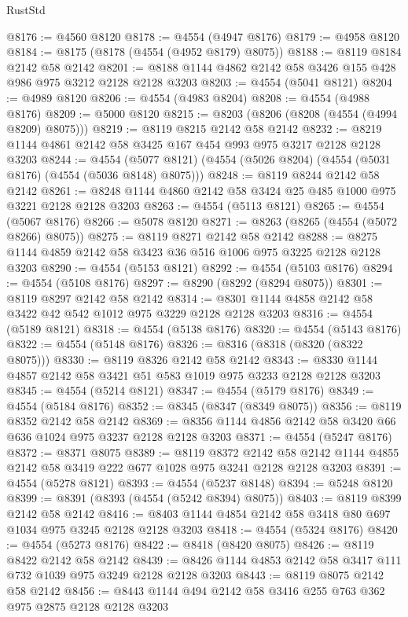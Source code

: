 \begin{lexlean}{RustStd}
\begin{coremodule}
{\begin{coremodule}
{{{{{{{{{{{{{{{{@8176 := @4560 @8120
@8178 := @4554 (@4947 @8176)
@8179 := @4958 @8120
@8184 := @8175 (@8178 (@4554 (@4952 @8179) @8075))
@8188 := @8119 @8184 @2142 @58 @2142
@8201 := @8188 @1144 @4862 @2142 @58 @3426 @155 @428 @986 @975 @3212 @2128 @2128 @3203
@8203 := @4554 (@5041 @8121)
@8204 := @4989 @8120
@8206 := @4554 (@4983 @8204)
@8208 := @4554 (@4988 @8176)
@8209 := @5000 @8120
@8215 := @8203 (@8206 (@8208 (@4554 (@4994 @8209) @8075)))
@8219 := @8119 @8215 @2142 @58 @2142
@8232 := @8219 @1144 @4861 @2142 @58 @3425 @167 @454 @993 @975 @3217 @2128 @2128 @3203
@8244 := @4554 (@5077 @8121) (@4554 (@5026 @8204) (@4554 (@5031 @8176) (@4554 (@5036 @8148) @8075)))
@8248 := @8119 @8244 @2142 @58 @2142
@8261 := @8248 @1144 @4860 @2142 @58 @3424 @25 @485 @1000 @975 @3221 @2128 @2128 @3203
@8263 := @4554 (@5113 @8121)
@8265 := @4554 (@5067 @8176)
@8266 := @5078 @8120
@8271 := @8263 (@8265 (@4554 (@5072 @8266) @8075))
@8275 := @8119 @8271 @2142 @58 @2142
@8288 := @8275 @1144 @4859 @2142 @58 @3423 @36 @516 @1006 @975 @3225 @2128 @2128 @3203
@8290 := @4554 (@5153 @8121)
@8292 := @4554 (@5103 @8176)
@8294 := @4554 (@5108 @8176)
@8297 := @8290 (@8292 (@8294 @8075))
@8301 := @8119 @8297 @2142 @58 @2142
@8314 := @8301 @1144 @4858 @2142 @58 @3422 @42 @542 @1012 @975 @3229 @2128 @2128 @3203
@8316 := @4554 (@5189 @8121)
@8318 := @4554 (@5138 @8176)
@8320 := @4554 (@5143 @8176)
@8322 := @4554 (@5148 @8176)
@8326 := @8316 (@8318 (@8320 (@8322 @8075)))
@8330 := @8119 @8326 @2142 @58 @2142
@8343 := @8330 @1144 @4857 @2142 @58 @3421 @51 @583 @1019 @975 @3233 @2128 @2128 @3203
@8345 := @4554 (@5214 @8121)
@8347 := @4554 (@5179 @8176)
@8349 := @4554 (@5184 @8176)
@8352 := @8345 (@8347 (@8349 @8075))
@8356 := @8119 @8352 @2142 @58 @2142
@8369 := @8356 @1144 @4856 @2142 @58 @3420 @66 @636 @1024 @975 @3237 @2128 @2128 @3203
@8371 := @4554 (@5247 @8176)
@8372 := @8371 @8075
@8389 := @8119
    @8372
    @2142
    @58
    @2142
    @1144
    @4855
    @2142
    @58
    @3419
    @222
    @677
    @1028
    @975
    @3241
    @2128
    @2128
    @3203
@8391 := @4554 (@5278 @8121)
@8393 := @4554 (@5237 @8148)
@8394 := @5248 @8120
@8399 := @8391 (@8393 (@4554 (@5242 @8394) @8075))
@8403 := @8119 @8399 @2142 @58 @2142
@8416 := @8403 @1144 @4854 @2142 @58 @3418 @80 @697 @1034 @975 @3245 @2128 @2128 @3203
@8418 := @4554 (@5324 @8176)
@8420 := @4554 (@5273 @8176)
@8422 := @8418 (@8420 @8075)
@8426 := @8119 @8422 @2142 @58 @2142
@8439 := @8426 @1144 @4853 @2142 @58 @3417 @111 @732 @1039 @975 @3249 @2128 @2128 @3203
@8443 := @8119 @8075 @2142 @58 @2142
@8456 := @8443 @1144 @494 @2142 @58 @3416 @255 @763 @362 @975 @2875 @2128 @2128 @3203
}}}}}}}}}}}}}}}}
\end{coremodule}}
\end{coremodule}
\end{lexlean}
